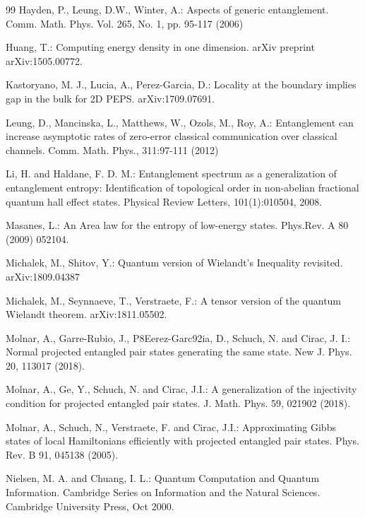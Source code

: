 \documentclass[smallextended]{svjour3}
\renewcommand{\1}{\mathbbm{1}}
\begin{document}
\begin{thebibliography}{99}
     Hayden, P.,  Leung, D.W., Winter, A.: Aspects of generic entanglement. Comm. Math. Phys. Vol. 265, No. 1, pp. 95-117 (2006)

     Huang,  T.: Computing energy density in one dimension. arXiv preprint arXiv:1505.00772.

      Kastoryano, M. J.,  Lucia, A.,  Perez-Garcia, D.: Locality at the boundary implies gap in the bulk for 2D PEPS. arXiv:1709.07691.


     Leung, D., Mancinska, L.,  Matthews, W., Ozols, M., Roy, A.: Entanglement can increase asymptotic rates of zero-error classical communication over classical channels. Comm. Math. Phys., 311:97-111 (2012)

     Li, H. and  Haldane, F. D. M.: Entanglement spectrum as a generalization of entanglement entropy: Identification of topological order in non-abelian fractional quantum hall effect states. Physical Review Letters, 101(1):010504, 2008.

     Masanes, L.: An Area law for the entropy of low-energy states.  Phys.Rev. A 80 (2009) 052104.

     Michalek, M.,  Shitov, Y.: Quantum version of Wielandt's Inequality revisited. arXiv:1809.04387

      Michalek, M.,  Seynnaeve, T.,  Verstraete, F.: A tensor version of the quantum Wielandt theorem. arXiv:1811.05502.

     Molnar,  A., Garre-Rubio, J.,  P\x8Eerez-Garc\x92ia, D., Schuch, N. and Cirac,  J. I.: Normal projected entangled pair states generating the same state. New J. Phys. 20, 113017 (2018).

     Molnar, A.,  Ge, Y.,  Schuch, N. and  Cirac, J.I.: A generalization of the injectivity condition for projected entangled pair states. J. Math. Phys. 59, 021902 (2018).

     Molnar, A., Schuch, N., Verstraete, F.  and  Cirac, J.I.: Approximating Gibbs states of local Hamiltonians efficiently with projected entangled pair states. Phys. Rev. B 91, 045138 (2005).


      Nielsen, M. A. and  Chuang, I. L.: Quantum Computation and Quantum Information. Cambridge Series on Information and the Natural Sciences. Cambridge University Press, Oct 2000.


\end{thebibliography}
\end{document}
